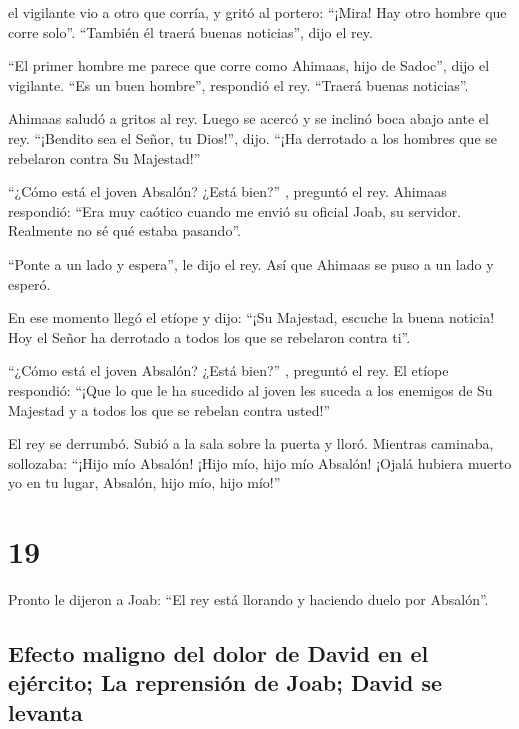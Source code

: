  el vigilante vio a otro que corría, y gritó al portero:
``¡Mira! Hay otro hombre que corre solo''. ``También él traerá buenas
noticias'', dijo el rey.

 ``El primer hombre me parece que corre como Ahimaas,
hijo de Sadoc'', dijo el vigilante. ``Es un buen hombre'', respondió el
rey. ``Traerá buenas noticias''.

 Ahimaas saludó a gritos al rey. Luego se acercó y se
inclinó boca abajo ante el rey. ``¡Bendito sea el Señor, tu Dios!'',
dijo. ``¡Ha derrotado a los hombres que se rebelaron contra Su
Majestad!''

 ``¿Cómo está el joven Absalón? ¿Está bien?'' , preguntó
el rey. Ahimaas respondió: ``Era muy caótico cuando me envió su oficial
Joab, su servidor. Realmente no sé qué estaba pasando''.

 ``Ponte a un lado y espera'', le dijo el rey. Así que
Ahimaas se puso a un lado y esperó.

 En ese momento llegó el etíope y dijo: ``¡Su Majestad,
escuche la buena noticia! Hoy el Señor ha derrotado a todos los que se
rebelaron contra ti''.

 ``¿Cómo está el joven Absalón? ¿Está bien?'' , preguntó
el rey. El etíope respondió: ``¡Que lo que le ha sucedido al joven les
suceda a los enemigos de Su Majestad y a todos los que se rebelan contra
usted!''

 El rey se derrumbó. Subió a la sala sobre la puerta y
lloró. Mientras caminaba, sollozaba: ``¡Hijo mío Absalón! ¡Hijo mío,
hijo mío Absalón! ¡Ojalá hubiera muerto yo en tu lugar, Absalón, hijo
mío, hijo mío!''

\hypertarget{section-18}{%
\section{19}\label{section-18}}

 Pronto le dijeron a Joab: ``El rey está llorando y
haciendo duelo por Absalón''.

\hypertarget{efecto-maligno-del-dolor-de-david-en-el-ejuxe9rcito-la-reprensiuxf3n-de-joab-david-se-levanta}{%
\subsection{Efecto maligno del dolor de David en el ejército; La
reprensión de Joab; David se
levanta}\label{efecto-maligno-del-dolor-de-david-en-el-ejuxe9rcito-la-reprensiuxf3n-de-joab-david-se-levanta}}

